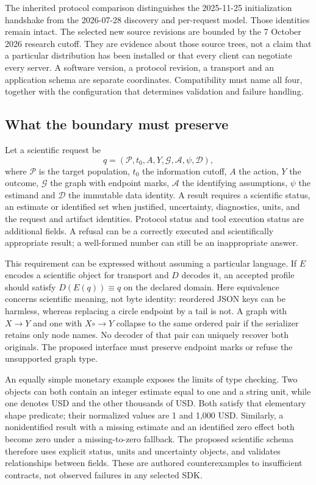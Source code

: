 The inherited protocol comparison distinguishes the 2025-11-25 initialization
handshake from the 2026-07-28 discovery and per-request model. Those identities
remain intact. The selected new source revisions are bounded by the 7 October
2026 research cutoff. They are evidence about those source trees, not a claim
that a particular distribution has been installed or that every client can
negotiate every server. A software version, a protocol revision, a transport
and an application schema are separate coordinates. Compatibility must name
all four, together with the configuration that determines validation and
failure handling.~\citep{v12_mcp_legacy_lifecycle,v12_mcp_basic,
v12_mcp_versioning,exec24_mcp_contracts}

\subsection{What the boundary must preserve}

Let a scientific request be
\[
 q=(\mathcal P,t_0,A,Y,\mathcal G,\mathcal A,\psi,\mathcal D),
\]
where $\mathcal P$ is the target population, $t_0$ the information cutoff,
$A$ the action, $Y$ the outcome, $\mathcal G$ the graph with endpoint marks,
$\mathcal A$ the identifying assumptions, $\psi$ the estimand and $\mathcal D$
the immutable data identity. A result requires a scientific status, an
estimate or identified set when justified, uncertainty, diagnostics, units,
and the request and artifact identities. Protocol status and tool execution
status are additional fields. A refusal can be a correctly executed and
scientifically appropriate result; a well-formed number can still be an
inappropriate answer.~\citep{exec24_mcp_contracts}

This requirement can be expressed without assuming a particular language.
If $E$ encodes a scientific object for transport and $D$ decodes it, an accepted
profile should satisfy $D(E(q))\equiv q$ on the declared domain. Here
equivalence concerns scientific meaning, not byte identity: reordered JSON
keys can be harmless, whereas replacing a circle endpoint by a tail is not.
A graph with $X\to Y$ and one with $X\mathbin{\circ\!\!\to}Y$ collapse to
the same ordered pair if the serializer retains only node names. No decoder
of that pair can uniquely recover both originals. The proposed interface must
preserve endpoint marks or refuse the unsupported graph type.
\citep{exec24_mcp_contracts}

An equally simple monetary example exposes the limits of type checking.
Two objects can both contain an integer estimate equal to one and a string
unit, while one denotes USD and the other thousands of USD. Both satisfy that
elementary shape predicate; their normalized values are 1 and 1,000 USD.
Similarly, a nonidentified result with a missing estimate and an identified
zero effect both become zero under a missing-to-zero fallback. The proposed
scientific schema therefore uses explicit status, units and uncertainty
objects, and validates relationships between fields. These are authored
counterexamples to insufficient contracts, not observed failures in any
selected SDK.~\citep{exec24_mcp_contracts}

